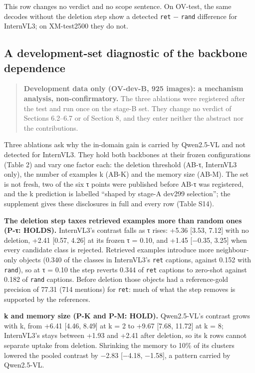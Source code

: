 This row changes no verdict and no scope sentence. On OV-test, the same decodes without the deletion
step show a detected \texttt{ret} − \texttt{rand} difference for InternVL3; on XM-test2500 they do
not.

\subsection{A development-set diagnostic of the backbone
dependence}\label{a-development-set-diagnostic-of-the-backbone-dependence}

\begin{quote}
\textbf{Development data only (OV-dev-B, 925 images): a mechanism analysis, non-confirmatory.} The
three ablations were registered after the test and run once on the stage-B set. They change no
verdict of Sections 6.2--6.7 or of Section 8, and they enter neither the abstract nor the
contributions.
\end{quote}

Three ablations ask why the in-domain gain is carried by Qwen2.5-VL and not detected for InternVL3.
They hold both backbones at their frozen configurations (Table 2) and vary one factor each: the
deletion threshold (AB-τ, InternVL3 only), the number of examples k (AB-K) and the memory size
(AB-M). The set is not fresh, two of the six τ points were published before AB-τ was registered, and
the k prediction is labelled ``shaped by stage-A dev299 selection''; the supplement gives these
disclosures in full and every row (Table S14).

\textbf{The deletion step taxes retrieved examples more than random ones (P-τ: HOLDS).} InternVL3's
contrast falls as τ rises: +5.36 {[}3.53, 7.12{]} with no deletion, +2.41 {[}0.57, 4.26{]} at its
frozen τ = 0.10, and +1.45 {[}−0.35, 3.25{]} when every candidate class is rejected. Retrieved
examples introduce more neighbour-only objects (0.340 of the classes in InternVL3's \texttt{ret}
captions, against 0.152 with \texttt{rand}), so at τ = 0.10 the step reverts 0.344 of \texttt{ret}
captions to zero-shot against 0.182 of \texttt{rand} captions. Before deletion those objects had a
reference-gold precision of 77.31 (714 mentions) for \texttt{ret}: much of what the step removes is
supported by the references.

\textbf{k and memory size (P-K and P-M: HOLD).} Qwen2.5-VL's contrast grows with k, from +6.41
{[}4.46, 8.49{]} at k = 2 to +9.67 {[}7.68, 11.72{]} at k = 8; InternVL3's stays between +1.93 and
+2.41 after deletion, so its k rows cannot separate uptake from deletion. Shrinking the memory to
10\% of its clusters lowered the pooled contrast by −2.83 {[}−4.18, −1.58{]}, a pattern carried by
Qwen2.5-VL.


